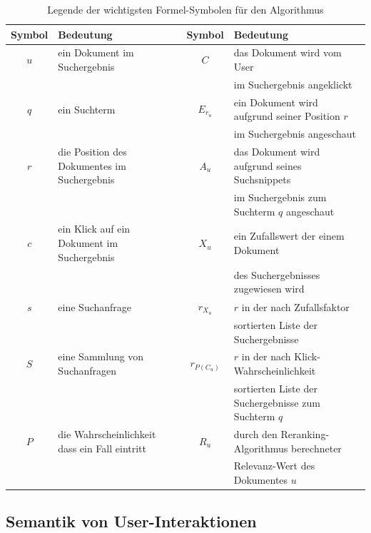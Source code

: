 \begin{table}[H]
\centering
\vspace{-.5em}
\caption[Legende der wichtigsten Formel-Symbolen für den Algorithmus]{Legende der wichtigsten Formel-Symbolen für den Algorithmus}
\label{tab:LegendeSymboleFormelnAlgorithmus}
\vspace{-.5em}
\footnotesize
\renewcommand*{\arraystretch}{1.2}
\begin{tabular}{clcl} \hline
\textbf{Symbol} & \textbf{Bedeutung} & \textbf{Symbol} & \textbf{Bedeutung} \\ \hline
$u$	& ein Dokument im Suchergebnis & $C$	& das Dokument wird vom User \\ &&& im Suchergebnis angeklickt \\ 
$q$	& ein Suchterm & $E_{r_{u}}$	& ein Dokument wird aufgrund seiner Position $r$ \\ &&& im Suchergebnis angeschaut \\
$r$	& die Position des Dokumentes im Suchergebnis &  $A_{u}$	& das Dokument wird aufgrund seines Suchsnippets \\ &&& im Suchergebnis zum Suchterm $q$ angeschaut \\ 
$c$	& ein Klick auf ein Dokument im Suchergebnis & $X_{u}$	& ein Zufallswert der einem Dokument \\ &&& des Suchergebnisses zugewiesen wird \\
$s$ 	& eine Suchanfrage & $r_{X_{u}}$	& $r$ in der nach Zufallsfaktor \\ &&& sortierten Liste der Suchergebnisse \\ 
$S$	& eine Sammlung von Suchanfragen & $r_{P(C_{u})}$ 	& $r$ in der nach Klick-Wahrscheinlichkeit \\ &&& sortierten Liste der Suchergebnisse zum Suchterm $q$\\
$P$	& die Wahrscheinlichkeit dass ein Fall eintritt &  $R_{u}$	& durch den Reranking-Algorithmus berechneter \\ &&& Relevanz-Wert des Dokumentes $u$ \\
\hline
\end{tabular}
\vspace{-2em}
\end{table}


\subsection{Semantik von User-Interaktionen}
\label{sec:Grundlagen:Grundbegriffe:SemantikUserInteraktionen}

